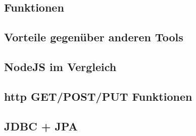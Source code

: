 \subsection{Funktionen}
\subsection{Vorteile gegenüber anderen Tools}
\subsection{NodeJS im Vergleich}
\subsection{http GET/POST/PUT Funktionen}
\subsection{JDBC + JPA}